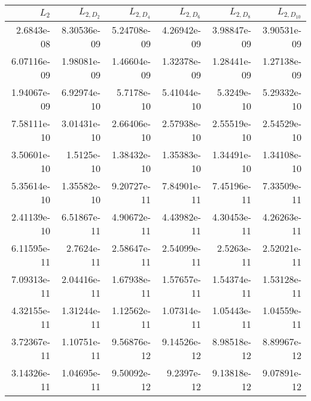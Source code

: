 \begin{tabular}{rrrrrr}
\toprule
$L_{2}$ & $L_{2,D_2}$ & $L_{2,D_4}$ & $L_{2,D_6}$ & $L_{2,D_8}$ & $L_{2,D_{10}}$ \\
\midrule
2.6843e-08 & 8.30536e-09 & 5.24708e-09 & 4.26942e-09 & 3.98847e-09 & 3.90531e-09 \\
6.07116e-09 & 1.98081e-09 & 1.46604e-09 & 1.32378e-09 & 1.28441e-09 & 1.27138e-09 \\
1.94067e-09 & 6.92974e-10 & 5.7178e-10 & 5.41044e-10 & 5.3249e-10 & 5.29332e-10 \\
7.58111e-10 & 3.01431e-10 & 2.66406e-10 & 2.57938e-10 & 2.55519e-10 & 2.54529e-10 \\
3.50601e-10 & 1.5125e-10 & 1.38432e-10 & 1.35383e-10 & 1.34491e-10 & 1.34108e-10 \\
5.35614e-10 & 1.35582e-10 & 9.20727e-11 & 7.84901e-11 & 7.45196e-11 & 7.33509e-11 \\
2.41139e-10 & 6.51867e-11 & 4.90672e-11 & 4.43982e-11 & 4.30453e-11 & 4.26263e-11 \\
6.11595e-11 & 2.7624e-11 & 2.58647e-11 & 2.54099e-11 & 2.5263e-11 & 2.52021e-11 \\
7.09313e-11 & 2.04416e-11 & 1.67938e-11 & 1.57657e-11 & 1.54374e-11 & 1.53128e-11 \\
4.32155e-11 & 1.31244e-11 & 1.12562e-11 & 1.07314e-11 & 1.05443e-11 & 1.04559e-11 \\
3.72367e-11 & 1.10751e-11 & 9.56876e-12 & 9.14526e-12 & 8.98518e-12 & 8.89967e-12 \\
3.14326e-11 & 1.04695e-11 & 9.50092e-12 & 9.2397e-12 & 9.13818e-12 & 9.07891e-12 \\
\bottomrule
\end{tabular}
